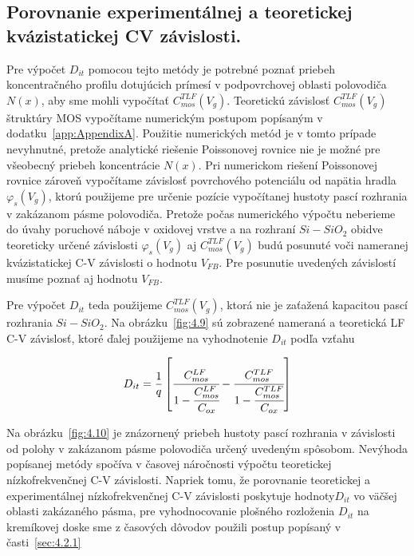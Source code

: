 \subsection{Porovnanie experimentálnej a teoretickej kvázistatickej CV závislosti.}\label{sec:4.2.2}

Pre výpočet $D_{it}$ pomocou tejto metódy je potrebné poznať priebeh
koncentračného profilu dotujúcich prímesí v podpovrchovej oblasti
polovodiča $N(x)$, aby sme mohli vypočítať
$C_{mos}^{TLF}(V_{g})$. Teoretickú závislosť $C_{mos}^{TLF}(V_{g})$
štruktúry MOS vypočítame numerickým postupom popísaným v
dodatku~\ref{app:AppendixA}.  Použitie numerických metód je v tomto
prípade nevyhnutné, pretože analytické riešenie Poissonovej rovnice
nie je možné pre všeobecný priebeh koncentrácie $N(x)$.  Pri
numerickom riešení Poissonovej rovnice zároveň vypočítame závislosť
povrchového potenciálu od napätia hradla $\varphi_{s}(V_{g})$, ktorú
použijeme pre určenie pozície vypočítanej hustoty pascí rozhrania v
zakázanom pásme polovodiča.  Pretože počas numerického výpočtu
neberieme do úvahy poruchové náboje v oxidovej vrstve a na rozhraní
$Si-SiO_{2}$ obidve teoreticky určené závislosti $\varphi_{s}(V_{g})$
aj $C_{mos}^{TLF}(V_{g})$ budú posunuté voči nameranej kvázistatickej
C-V závislosti o hodnotu $V_{FB}$. Pre posunutie uvedených závislostí
musíme poznať aj hodnotu $V_{FB}$.

\par Pre výpočet $D_{it}$ teda použijeme $C_{mos}^{TLF}(V_{g})$, ktorá
nie je zaťažená kapacitou pascí rozhrania $Si-SiO_{2}$. Na
obrázku~\ref{fig:4.9} sú zobrazené nameraná a teoretická LF C-V
závislosť, ktoré ďalej použijeme na vyhodnotenie $D_{it}$ podľa vzťahu

\begin{equation}\label{eq:4.18}
  D_{it} = \frac{1}{q} \left[\cfrac{C_{mos}^{LF}}{1-\cfrac{C_{mos}^{LF}}{C_{ox}}}-\cfrac{C_{mos}^{TLF}}{1-\cfrac{C_{mos}^{TLF}}{C_{ox}}}\right]
\end{equation}

Na obrázku~\ref{fig:4.10} je znázornený priebeh hustoty pascí
rozhrania v závislosti od polohy v zakázanom pásme polovodiča určený
uvedeným spôsobom.  Nevýhoda popísanej metódy spočíva v časovej
náročnosti výpočtu teoretickej nízkofrekvenčnej C-V
závislosti. Napriek tomu, že porovnanie teoretickej a experimentálnej
nízkofrekvenčnej C-V závislosti poskytuje hodnoty$D_{it}$ vo väčšej
oblasti zakázaného pásma, pre vyhodnocovanie plošného rozloženia
$D_{it}$ na kremíkovej doske sme z časových dôvodov použili postup
popísaný v časti~\ref{sec:4.2.1}

